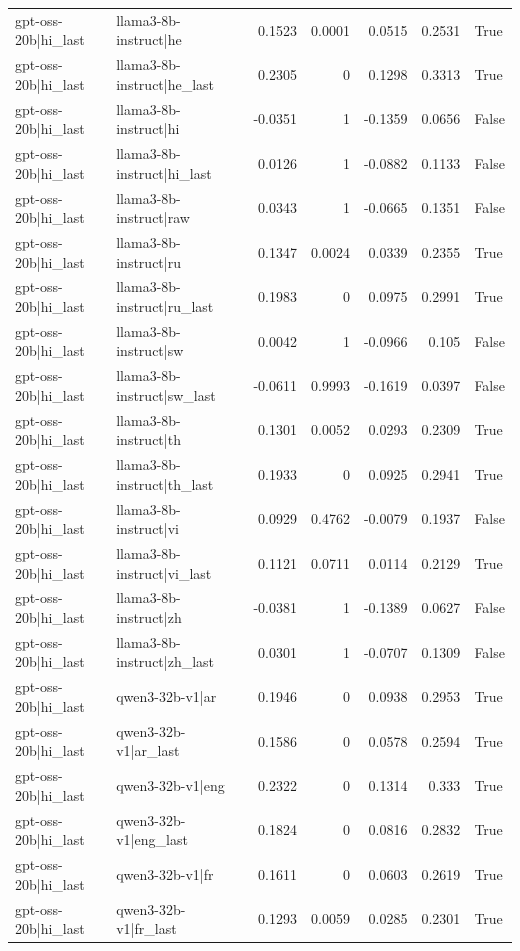 \begin{table}
\begin{tabular}{l l r r r r l}
gpt-oss-20b|hi_last & llama3-8b-instruct|he & 0.1523 & 0.0001 & 0.0515 & 0.2531 & True \\
gpt-oss-20b|hi_last & llama3-8b-instruct|he_last & 0.2305 & 0 & 0.1298 & 0.3313 & True \\
gpt-oss-20b|hi_last & llama3-8b-instruct|hi & -0.0351 & 1 & -0.1359 & 0.0656 & False \\
gpt-oss-20b|hi_last & llama3-8b-instruct|hi_last & 0.0126 & 1 & -0.0882 & 0.1133 & False \\
gpt-oss-20b|hi_last & llama3-8b-instruct|raw & 0.0343 & 1 & -0.0665 & 0.1351 & False \\
gpt-oss-20b|hi_last & llama3-8b-instruct|ru & 0.1347 & 0.0024 & 0.0339 & 0.2355 & True \\
gpt-oss-20b|hi_last & llama3-8b-instruct|ru_last & 0.1983 & 0 & 0.0975 & 0.2991 & True \\
gpt-oss-20b|hi_last & llama3-8b-instruct|sw & 0.0042 & 1 & -0.0966 & 0.105 & False \\
gpt-oss-20b|hi_last & llama3-8b-instruct|sw_last & -0.0611 & 0.9993 & -0.1619 & 0.0397 & False \\
gpt-oss-20b|hi_last & llama3-8b-instruct|th & 0.1301 & 0.0052 & 0.0293 & 0.2309 & True \\
gpt-oss-20b|hi_last & llama3-8b-instruct|th_last & 0.1933 & 0 & 0.0925 & 0.2941 & True \\
gpt-oss-20b|hi_last & llama3-8b-instruct|vi & 0.0929 & 0.4762 & -0.0079 & 0.1937 & False \\
gpt-oss-20b|hi_last & llama3-8b-instruct|vi_last & 0.1121 & 0.0711 & 0.0114 & 0.2129 & True \\
gpt-oss-20b|hi_last & llama3-8b-instruct|zh & -0.0381 & 1 & -0.1389 & 0.0627 & False \\
gpt-oss-20b|hi_last & llama3-8b-instruct|zh_last & 0.0301 & 1 & -0.0707 & 0.1309 & False \\
gpt-oss-20b|hi_last & qwen3-32b-v1|ar & 0.1946 & 0 & 0.0938 & 0.2953 & True \\
gpt-oss-20b|hi_last & qwen3-32b-v1|ar_last & 0.1586 & 0 & 0.0578 & 0.2594 & True \\
gpt-oss-20b|hi_last & qwen3-32b-v1|eng & 0.2322 & 0 & 0.1314 & 0.333 & True \\
gpt-oss-20b|hi_last & qwen3-32b-v1|eng_last & 0.1824 & 0 & 0.0816 & 0.2832 & True \\
gpt-oss-20b|hi_last & qwen3-32b-v1|fr & 0.1611 & 0 & 0.0603 & 0.2619 & True \\
gpt-oss-20b|hi_last & qwen3-32b-v1|fr_last & 0.1293 & 0.0059 & 0.0285 & 0.2301 & True \\

\end{tabular}
\end{table}
